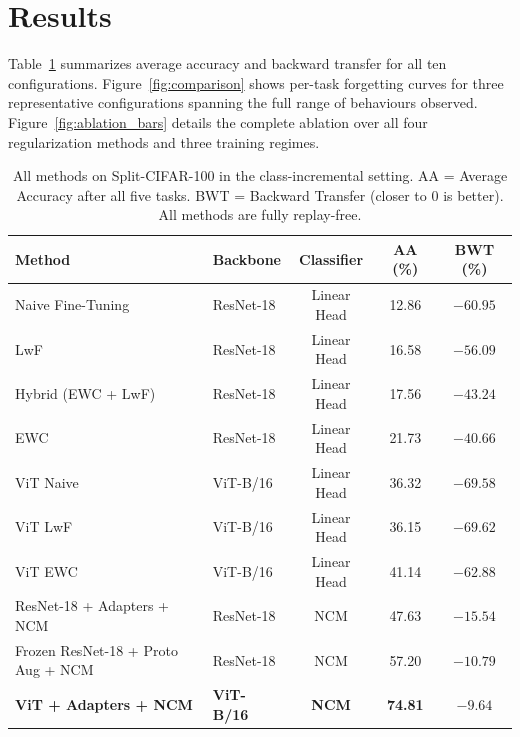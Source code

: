 \documentclass{article}
\begin{document}
\section{Results}
\label{sec:results}

Table~\ref{tab:results} summarizes average accuracy and backward transfer for
all ten configurations. Figure~\ref{fig:comparison} shows per-task forgetting
curves for three representative configurations spanning the full range of
behaviours observed. Figure~\ref{fig:ablation_bars} details the complete
ablation over all four regularization methods and three training regimes.

\begin{table}[h]
\centering
\caption{All methods on Split-CIFAR-100 in the class-incremental setting.
AA = Average Accuracy after all five tasks. BWT = Backward Transfer (closer
to 0 is better). All methods are fully replay-free.}
\label{tab:results}
\renewcommand{\arraystretch}{1.25}
\begin{tabular}{llccc}
\toprule
\textbf{Method} & \textbf{Backbone} & \textbf{Classifier}
  & \textbf{AA (\%)} & \textbf{BWT (\%)} \\
\midrule
Naive Fine-Tuning                  & ResNet-18 & Linear Head & 12.86 & $-60.95$ \\
LwF                                & ResNet-18 & Linear Head & 16.58 & $-56.09$ \\
Hybrid (EWC + LwF)                 & ResNet-18 & Linear Head & 17.56 & $-43.24$ \\
EWC                                & ResNet-18 & Linear Head & 21.73 & $-40.66$ \\
\midrule
ViT Naive                          & ViT-B/16  & Linear Head & 36.32 & $-69.58$ \\
ViT LwF                            & ViT-B/16  & Linear Head & 36.15 & $-69.62$ \\
ViT EWC                            & ViT-B/16  & Linear Head & 41.14 & $-62.88$ \\
\midrule
ResNet-18 + Adapters + NCM         & ResNet-18 & NCM         & 47.63 & $-15.54$ \\
Frozen ResNet-18 + Proto Aug + NCM & ResNet-18 & NCM         & 57.20 & $-10.79$ \\
\textbf{ViT + Adapters + NCM}
  & \textbf{ViT-B/16} & \textbf{NCM}
  & \textbf{74.81} & $\mathbf{-9.64}$ \\
\bottomrule
\end{tabular}
\end{table}
\end{document}
